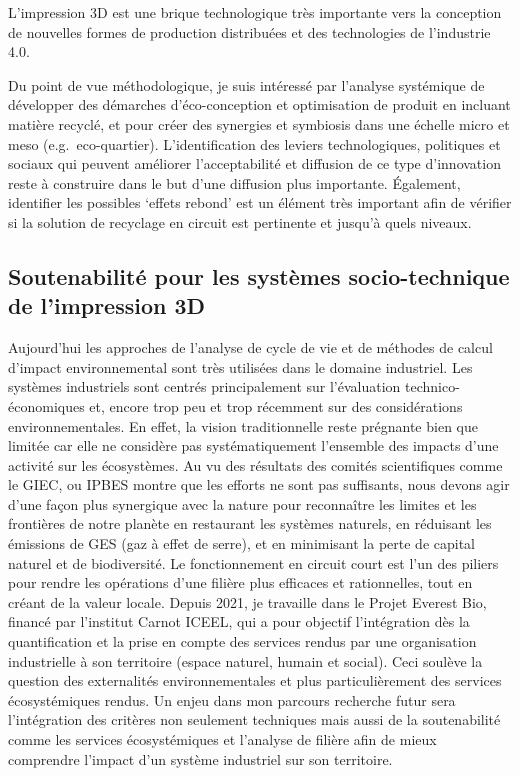 \documentclass[
  12pt,
  oneside]{book}
\begin{document}
L'impression 3D est une brique technologique très importante vers la conception de nouvelles formes de production distribuées et des technologies de l'industrie 4.0.

Du point de vue méthodologique, je suis intéressé par l'analyse systémique de développer des démarches d'éco-conception et optimisation de produit en incluant matière recyclé, et pour créer des synergies et symbiosis dans une échelle micro et meso (e.g.~eco-quartier). L'identification des leviers technologiques, politiques et sociaux qui peuvent améliorer l'acceptabilité et diffusion de ce type d'innovation reste à construire dans le but d'une diffusion plus importante. Également, identifier les possibles `effets rebond' est un élément très important afin de vérifier si la solution de recyclage en circuit est pertinente et jusqu'à quels niveaux.

\hypertarget{soutenabilituxe9-pour-les-systuxe8mes-socio-technique-de-limpression-3d}{%
\subsection{Soutenabilité pour les systèmes socio-technique de l'impression 3D}\label{soutenabilituxe9-pour-les-systuxe8mes-socio-technique-de-limpression-3d}}

Aujourd'hui les approches de l'analyse de cycle de vie et de méthodes de calcul d'impact environnemental sont très utilisées dans le domaine industriel. Les systèmes industriels sont centrés principalement sur l'évaluation technico-économiques et, encore trop peu et trop récemment sur des considérations environnementales. En effet, la vision traditionnelle reste prégnante bien que limitée car elle ne considère pas systématiquement l'ensemble des impacts d'une activité sur les écosystèmes. Au vu des résultats des comités scientifiques comme le GIEC, ou IPBES montre que les efforts ne sont pas suffisants, nous devons agir d'une façon plus synergique avec la nature pour reconnaître les limites et les frontières de notre planète en restaurant les systèmes naturels, en réduisant les émissions de GES (gaz à effet de serre), et en minimisant la perte de capital naturel et de biodiversité.
Le fonctionnement en circuit court est l'un des piliers pour rendre les opérations d'une filière plus efficaces et rationnelles, tout en créant de la valeur locale. Depuis 2021, je travaille dans le Projet Everest Bio, financé par l'institut Carnot ICEEL, qui a pour objectif l'intégration dès la quantification et la prise en compte des services rendus par une organisation industrielle à son territoire (espace naturel, humain et social).
Ceci soulève la question des externalités environnementales et plus particulièrement des services écosystémiques rendus.
Un enjeu dans mon parcours recherche futur sera l'intégration des critères non seulement techniques mais aussi de la soutenabilité comme les services écosystémiques et l'analyse de filière afin de mieux comprendre l'impact d'un système industriel sur son territoire.
\end{document}
